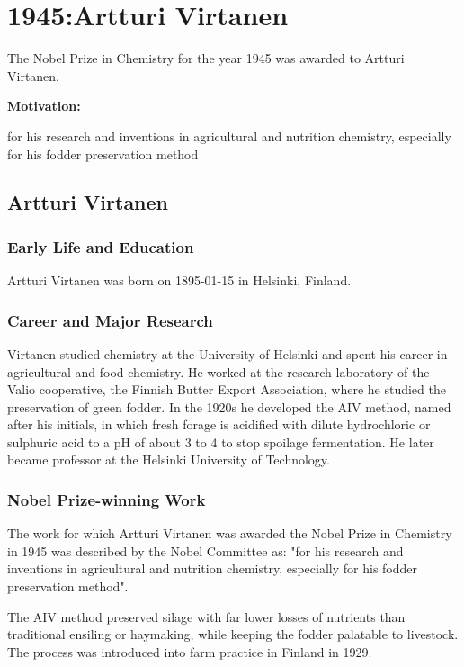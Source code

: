 \chapter{1945:Artturi Virtanen}

\label{chap:chemistry1945}

The Nobel Prize in Chemistry for the year 1945 was awarded to Artturi Virtanen.

\textbf{Motivation:}

for his research and inventions in agricultural and nutrition chemistry, especially for his fodder preservation method

\section{Artturi Virtanen}

\subsection*{Early Life and Education}

Artturi Virtanen was born on 1895-01-15 in Helsinki, Finland.

\subsection*{Career and Major Research}

Virtanen studied chemistry at the University of Helsinki and spent his career in agricultural and food chemistry. He worked at the research laboratory of the Valio cooperative, the Finnish Butter Export Association, where he studied the preservation of green fodder. In the 1920s he developed the AIV method, named after his initials, in which fresh forage is acidified with dilute hydrochloric or sulphuric acid to a pH of about 3 to 4 to stop spoilage fermentation. He later became professor at the Helsinki University of Technology.

\subsection*{Nobel Prize-winning Work}

The work for which Artturi Virtanen was awarded the Nobel Prize in Chemistry in 1945 was described by the Nobel Committee as: "for his research and inventions in agricultural and nutrition chemistry, especially for his fodder preservation method".

The AIV method preserved silage with far lower losses of nutrients than traditional ensiling or haymaking, while keeping the fodder palatable to livestock. The process was introduced into farm practice in Finland in 1929.

